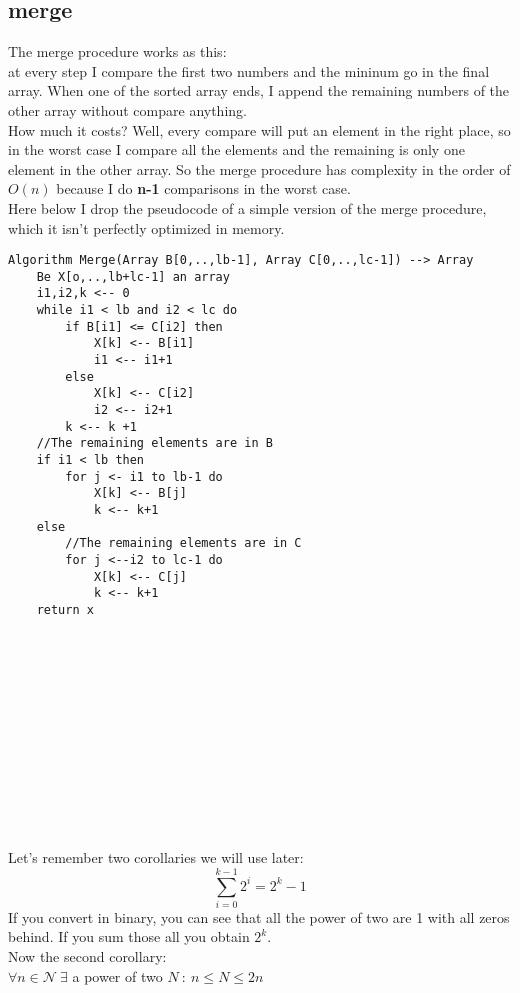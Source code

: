 \documentclass{article}
\begin{document}
\subsection{merge}
The merge procedure works as this: \\
at every step I compare the first two numbers and the mininum go in the final array. When one of the sorted array ends, I append the remaining numbers of the other array without compare anything.\\
How much it costs? Well, every compare will put an element in the right place, so in the worst case I compare all the elements and the remaining is only one element in the other array. So the merge procedure has complexity in the order of $O(n)$ because I do \textbf{n-1} comparisons in the worst case.\\
Here below I drop the pseudocode of a simple version of the merge procedure, which it isn't perfectly optimized in memory.\\

\begin{lstlisting}[caption={\\\textit{Merge algorithm.}}]
Algorithm Merge(Array B[0,..,lb-1], Array C[0,..,lc-1]) --> Array 
	Be X[o,..,lb+lc-1] an array
	i1,i2,k <-- 0
	while i1 < lb and i2 < lc do
		if B[i1] <= C[i2] then
			X[k] <-- B[i1]
			i1 <-- i1+1
		else
			X[k] <-- C[i2]
			i2 <-- i2+1
		k <-- k +1
	//The remaining elements are in B	
	if i1 < lb then
		for j <- i1 to lb-1 do
			X[k] <-- B[j]
			k <-- k+1
	else
		//The remaining elements are in C
		for j <--i2 to lc-1 do
			X[k] <-- C[j]
			k <-- k+1
	return x
\end{lstlisting}
\leavevmode \\ \\ \\ \\ \\ \\ \\ \\ \\ \\ \\
Let's remember two corollaries we will use later:\\
$$\sum_{i = 0}^{k-1} 2^i = 2^k -1$$
If you convert in binary, you can see that all the power of two are 1 with all zeros behind. If you sum those all you obtain $2^k$. \\
Now the second corollary:\\
$\forall n \in \mathcal{N} \ \exists $ a power of two $N \ : \ n \leq N \leq 2n$
\end{document}
